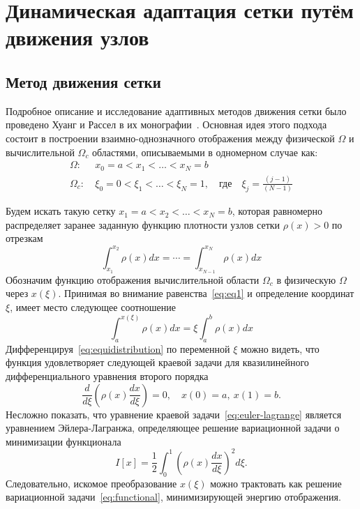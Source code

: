\chapter{Динамическая адаптация сетки путём движения узлов} \label{ch:ch2}

\section{Метод движения сетки}
Подробное описание и исследование адаптивных методов движения сетки было проведено Хуанг и Рассел в их монографии~\cite{huang_adaptive_2011}. Основная идея этого подхода состоит в построении взаимно-однозначного отображения между физической $\Omega$ и вычислительной $\Omega_c$  областями, описываемыми в одномерном случае как:
\begin{align}
\Omega:&\ x_0=a<x_1<\dots<x_N = b \\
\Omega_c:&\ \xi_0=0<\xi_1<\dots<\xi_N = 1,\quad \text{где}\quad \xi_j = \frac{(j-1)}{(N-1)}
\end{align}

Будем искать такую сетку $x_1 = a<x_2<\dots<x_N=b$, которая равномерно распределяет заранее заданную функцию плотности узлов сетки  $\rho(x) > 0$ по отрезкам
\begin{equation}
\int_{x_1}^{x_2}\rho(x)dx = \cdots = \int_{x_{N-1}}^{x_N}\rho(x)dx
\label{eq:eq1}
\end{equation}
Обозначим функцию отображения вычислительной области $\Omega_c$  в физическую $\Omega$ через $x(\xi)$. Принимая во внимание равенства~\eqref{eq:eq1} и определение координат $\xi$, имеет место следующее соотношение
\begin{equation}
\int_{a}^{x(\xi)}\rho(x)dx = \xi \int_{a}^{b}\rho(x)dx
\label{eq:equidistribution}
\end{equation}
Дифференцируя~\eqref{eq:equidistribution} по переменной $\xi$ можно видеть, что функция   удовлетворяет следующей краевой задачи для квазилинейного дифференциального уравнения второго порядка
\begin{equation}
\frac{d}{d\xi}\left(\rho(x)\frac{dx}{d\xi} \right) = 0, \quad x(0)=a, \ x(1) = b.	
\label{eq:euler-lagrange}
\end{equation}
Несложно показать, что уравнение краевой задачи~\eqref{eq:euler-lagrange} является уравнением Эйлера-Лагранжа, определяющее решение вариационной задачи о минимизации функционала 
\begin{equation}
I[x] = \frac{1}{2}\int_{0}^{1}\left(\rho(x)\frac{dx}{d\xi} \right)^2d\xi.
\label{eq:functional}
\end{equation}
Следовательно, искомое преобразование $x(\xi)$  можно трактовать как решение вариационной задачи~\eqref{eq:functional}, минимизирующей энергию отображения.

